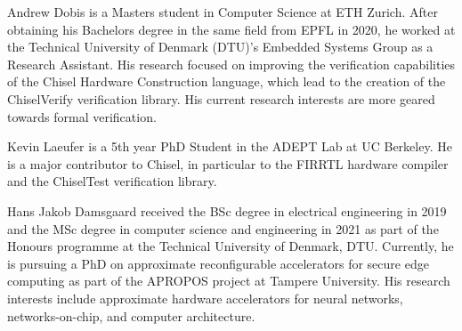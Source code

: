 \documentclass[conference]{IEEEtran}
\begin{document}
\begin{IEEEbiography}{Andrew Dobis}
is a Masters student in Computer Science at ETH Zurich. 
After obtaining his Bachelors degree in the same field from EPFL in 2020, he worked at the Technical University of Denmark (DTU)'s Embedded Systems Group as a Research Assistant.
His research focused on improving the verification capabilities of the Chisel Hardware Construction language, which lead to the creation of the ChiselVerify verification library.
His current research interests are more geared towards formal verification.
\end{IEEEbiography}

\begin{IEEEbiography}{Kevin Laeufer}
  is a 5th year PhD Student in the ADEPT Lab at UC Berkeley.
  He is a major contributor to Chisel, in particular to the FIRRTL hardware compiler and the ChiselTest verification library.
\end{IEEEbiography}

\begin{IEEEbiography}{Hans Jakob Damsgaard}
received the BSc degree in electrical engineering in 2019 and the MSc degree in
computer science and engineering in 2021 as part of the Honours programme at the
Technical University of Denmark, DTU. Currently, he is pursuing a PhD
on approximate reconfigurable accelerators for secure edge computing as part
of the APROPOS project at Tampere University. His research interests include
approximate hardware accelerators for neural networks, networks-on-chip, and computer architecture.
\end{IEEEbiography}
\end{document}
